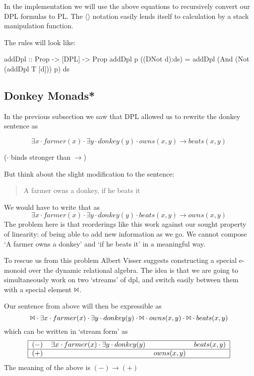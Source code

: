 \documentclass[12pt]{article}
\begin{document}
In the implementation we will use the above equations to recursively convert our DPL formulas to PL. The $\langle\rangle$ notation easily lends itself to calculation by a stack manipulation function.

The rules will look like:
\begin{haskell}
addDpl :: Prop -> [DPL] -> Prop
addDpl p ((DNot d):ds) = addDpl (And (Not (addDpl T [d])) p) ds
\end{haskell}


\subsection{Donkey Monads*}

In the previous subsection we saw that DPL allowed us to rewrite the donkey sentence as 

\begin{equation}
\exists x \cdot farmer(x) \cdot \exists y \cdot donkey(y) \cdot owns(x,y) \rightarrow beats(x,y)
\end{equation}

($\cdot$ binds stronger than $\rightarrow$)

But think about the slight modification to the sentence:
%
\begin{quotation}
A farmer owns a donkey, if he beats it
\end{quotation}
%
We would have to write that as
%
\begin{equation}
\exists x \cdot farmer(x) \cdot \exists y \cdot donkey(y) \cdot beats(x,y) \rightarrow owns(x,y)
\end{equation}
%
The problem here is that reorderings like this work against our sought property of linearity: of being able to add new information as we go. We cannot compose `A farmer owns a donkey' and `if he beats it' in a meaningful way.

To rescue us from this problem Albert Visser suggests constructing a special e-monoid over the dynamic relational algebra. The idea is that we are going to simultaneously work on two `streams' of dpl, and switch easily between them with a special element $\Bowtie$.

Our sentence from above will then be expressible as
%
\begin{equation}
\Bowtie \cdot \exists x \cdot farmer(x) \cdot \exists y \cdot donkey(y) \cdot \Bowtie \cdot owns(x,y) \cdot \Bowtie \cdot beats(x,y)
\end{equation}
%
which can be written in `stream form' as
%
\begin{equation}
\begin{tabular}{|clll|}
    \hline
    $(-)$ & $\exists x \cdot farmer(x) \cdot \exists y \cdot donkey(y)$ & ~ & $beats(x,y)$ \\\hline
    $(+)$ & ~ & $owns(x,y)$ & ~ \\\hline
\end{tabular}
\end{equation}
%
The meaning of the above is $(-) \rightarrow (+)$
\end{document}
